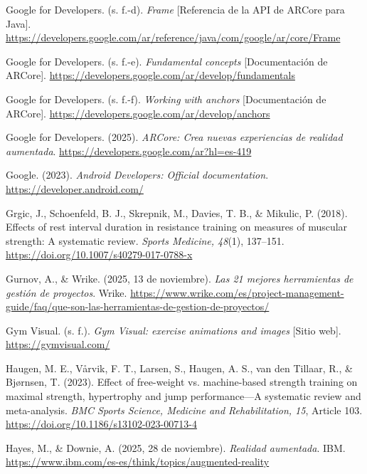 \begin{referenciasapa}
\item Google for Developers. (s. f.-d). \textit{Frame} [Referencia de la API de ARCore para Java]. \url{https://developers.google.com/ar/reference/java/com/google/ar/core/Frame}

\item Google for Developers. (s. f.-e). \textit{Fundamental concepts} [Documentación de ARCore]. \url{https://developers.google.com/ar/develop/fundamentals}

\item Google for Developers. (s. f.-f). \textit{Working with anchors} [Documentación de ARCore]. \url{https://developers.google.com/ar/develop/anchors}

\item Google for Developers. (2025). \textit{ARCore: Crea nuevas experiencias de realidad aumentada}. \url{https://developers.google.com/ar?hl=es-419}

\item Google. (2023). \textit{Android Developers: Official documentation}. \url{https://developer.android.com/}

\item Grgic, J., Schoenfeld, B. J., Skrepnik, M., Davies, T. B., \& Mikulic, P. (2018). Effects of rest interval duration in resistance training on measures of muscular strength: A systematic review. \textit{Sports Medicine, 48}(1), 137--151. \url{https://doi.org/10.1007/s40279-017-0788-x}

\item Gurnov, A., \& Wrike. (2025, 13 de noviembre). \textit{Las 21 mejores herramientas de gestión de proyectos}. Wrike. \url{https://www.wrike.com/es/project-management-guide/faq/que-son-las-herramientas-de-gestion-de-proyectos/}

\item Gym Visual. (s. f.). \textit{Gym Visual: exercise animations and images} [Sitio web]. \url{https://gymvisual.com/}

\item Haugen, M. E., Vårvik, F. T., Larsen, S., Haugen, A. S., van den Tillaar, R., \& Bjørnsen, T. (2023). Effect of free-weight vs. machine-based strength training on maximal strength, hypertrophy and jump performance---A systematic review and meta-analysis. \textit{BMC Sports Science, Medicine and Rehabilitation, 15}, Article 103. \url{https://doi.org/10.1186/s13102-023-00713-4}

\item Hayes, M., \& Downie, A. (2025, 28 de noviembre). \textit{Realidad aumentada}. IBM. \url{https://www.ibm.com/es-es/think/topics/augmented-reality}


\end{referenciasapa}
